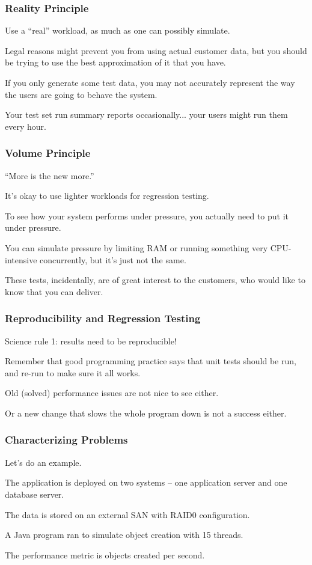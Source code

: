 \begin{frame}
\frametitle{Reality Principle}
Use a ``real'' workload, as much as one can possibly simulate. 

Legal reasons might prevent you from using actual customer data, but you should be trying to use the best approximation of it that you have. 

If you only generate some test data, you may not accurately represent the way the users are going to behave the system. 

Your test set run summary reports occasionally... your users might run them every hour. 

\end{frame}



\begin{frame}
\frametitle{Volume Principle}
``More is the new more.'' 

It's okay to use lighter workloads for regression testing. 

To see how your system performs under pressure, you actually need to put it under pressure. 

You can simulate pressure by limiting RAM or running something very CPU-intensive concurrently, but it's just not the same.

These tests, incidentally, are of great interest to the customers, who would like to know that you can deliver. 


\end{frame}



\begin{frame}
\frametitle{Reproducibility and Regression Testing}

Science rule 1: results need to be reproducible!

Remember that good programming practice says that unit tests should be run, and re-run to make sure it all works. 

Old (solved) performance issues are not nice to see either. 

Or a new change that slows the whole program down is not a success either.

\end{frame}



\begin{frame}
\frametitle{Characterizing Problems}

Let's do an example. 

The application is deployed on two systems -- one application server and one database server. 

The data is stored on an external SAN with RAID0 configuration. 

A Java program ran to simulate object creation with 15 threads. 

The performance metric is objects created per second. 


\end{frame}




